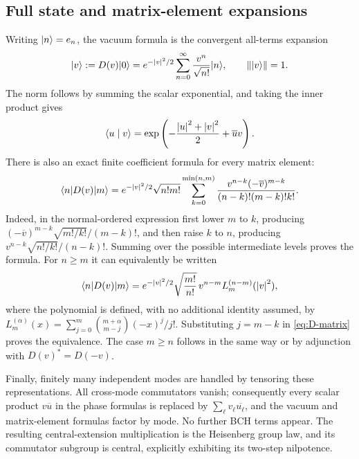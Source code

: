 \subsection{Full state and matrix-element expansions}
Writing $\lvert n\rangle=e_n$, the vacuum formula is the convergent all-terms expansion
\begin{equation}\label{eq:coherent}
 \lvert v\rangle:=D(v)\lvert 0\rangle
 =e^{-\left\lvert v\right\rvert^2/2}\sum_{n=0}^{\infty}\frac{v^n}{\sqrt{n!}}\lvert n\rangle,
 \qquad \left\lVert \lvert v\rangle\right\rVert=1.
\end{equation}
The norm follows by summing the scalar exponential, and taking the inner product gives
\begin{equation}\label{eq:coherent-overlap}
 \langle u\mid v\rangle=\exp\left(-\frac{\left\lvert u\right\rvert^2+\left\lvert v\right\rvert^2}{2}+\overline u v\right).
\end{equation}
There is also an exact finite coefficient formula for every matrix element:
\begin{equation}\label{eq:D-matrix}
 \langle n\rvert D(v)\lvert m\rangle
 =e^{-\left\lvert v\right\rvert^2/2}\sqrt{n!m!}
 \sum_{k=0}^{\min(n,m)}
 \frac{v^{n-k}(-\overline v)^{m-k}}
 {(n-k)!(m-k)!k!}.
\end{equation}
Indeed, in the normal-ordered expression first lower $m$ to $k$, producing
$(-\overline v)^{m-k}\sqrt{m!/k!}/(m-k)!$,
and then raise $k$ to $n$, producing
$v^{n-k}\sqrt{n!/k!}/(n-k)!$. Summing over the possible intermediate levels proves the formula.
For $n\geq m$ it can equivalently be written
\begin{equation}
 \langle n\rvert D(v)\lvert m\rangle
 =e^{-\left\lvert v\right\rvert^2/2}\sqrt{\frac{m!}{n!}}\,
 v^{n-m}L_m^{(n-m)}(\left\lvert v\right\rvert^2),
\end{equation}
where the polynomial is defined, with no additional identity assumed, by
$L_m^{(\alpha)}(x)=\sum_{j=0}^m\binom{m+\alpha}{m-j}(-x)^j/j!$.
Substituting $j=m-k$ in \cref{eq:D-matrix} proves the equivalence. The case $m\geq n$ follows in the same way or by adjunction with $D(v)^*=D(-v)$.

Finally, finitely many independent modes are handled by tensoring these representations. All cross-mode commutators vanish; consequently every scalar product $v\overline u$ in the phase formulas is replaced by $\sum_\ell v_\ell\overline{u_\ell}$, and the vacuum and matrix-element formulas factor by mode. No further BCH terms appear. The resulting central-extension multiplication is the Heisenberg group law, and its commutator subgroup is central, explicitly exhibiting its two-step nilpotence.
